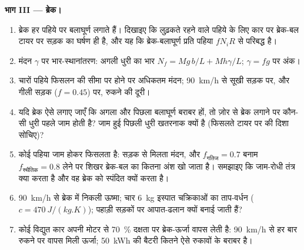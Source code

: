 \begin{problem}
\medskip
\noindent\textbf{भाग III --- ब्रेक।}
\begin{enumerate}[resume]
  \item ब्रेक हर पहिये पर बलाघूर्ण लगाते हैं। दिखाइए कि लुढ़कते रहने
        वाले पहिये के लिए कार पर ब्रेक-बल टायर पर सड़क का
        घर्षण ही है, और यह कि ब्रेक-बलाघूर्ण
        प्रति पहिया $fN_iR$ से परिबद्ध है।
  \item मंदन $\gamma$ पर भार-स्थानांतरण: अगली धुरी का भार
        $N_f = Mg\,b/L + Mh\gamma/L$; $\gamma = fg$ पर अंक।
  \item चारों पहिये फिसलन की सीमा पर होने पर अधिकतम मंदन;
        \qty{90}{km/h} से सूखी सड़क पर, और गीली सड़क ($f = 0.45$) पर,
        रुकने की दूरी।
  \item यदि ब्रेक ऐसे लगाए जाएँ कि अगला और पिछला बलाघूर्ण बराबर हों,
        तो ज़ोर से ब्रेक लगाने पर कौन-सी धुरी पहले जाम होती है? जाम हुई
        पिछली धुरी खतरनाक क्यों है (फिसलते टायर पर  की
        दिशा सोचिए)?
  \item कोई पहिया जाम होकर फिसलता है: सड़क से मिलता मंदन, और
        $f_{\text{गतिज}} =
        0.7$ बनाम $f_{\text{स्थैतिक}} = 0.8$ लेने पर शिखर ब्रेक-बल का कितना
        अंश खो जाता है। समझाइए कि जाम-रोधी तंत्र क्या करता है और वह
        ब्रेक को स्पंदित क्यों करता है।
  \item \qty{90}{km/h} से ब्रेक में निकली ऊष्मा; चार \qty{6}{kg} इस्पात
        चक्रिकाओं का ताप-वर्धन ($c = \qty{470}{J/(kg.K)}$);
        पहाड़ी सड़कों पर आपात-ढलान क्यों बनाई जाती हैं?
  \item कोई विद्युत कार अपनी मोटर से \qty{70}{\%} दक्षता पर ब्रेक-ऊर्जा
        वापस लेती है: \qty{90}{km/h} से हर बार रुकने पर वापस मिली
        ऊर्जा; \qty{50}{kWh} की बैटरी कितने ऐसे रुकावों के
        बराबर है।
\end{enumerate}


\end{problem}
